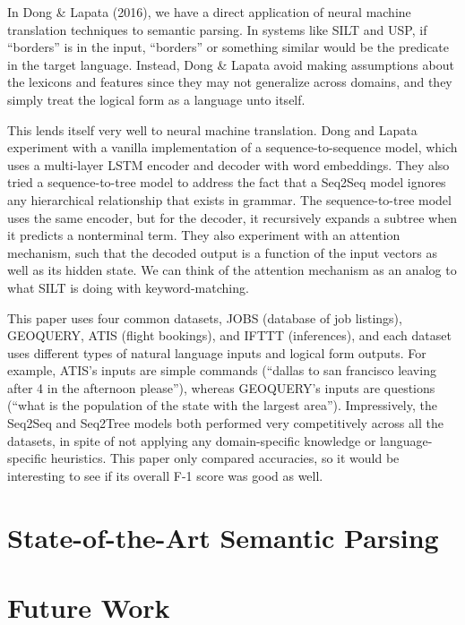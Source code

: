 \documentclass[a4paper]{article}
\theoremstyle{definition}
\begin{document}
In Dong \& Lapata (2016), we have a direct application of neural machine translation techniques to semantic parsing. In systems like SILT and USP, if ``borders'' is in the input, ``borders'' or something similar would be the predicate in the target language. Instead, Dong \& Lapata avoid making assumptions about the lexicons and features since they may not generalize across domains, and they simply treat the logical form as a language unto itself.

\quad This lends itself very well to neural machine translation. Dong and Lapata experiment with a vanilla implementation of a sequence-to-sequence model, which uses a multi-layer LSTM encoder and decoder with word embeddings. They also tried a sequence-to-tree model to address the fact that a Seq2Seq model ignores any hierarchical relationship that exists in grammar. The sequence-to-tree model uses the same encoder, but for the decoder, it recursively expands a subtree when it predicts a nonterminal term. They also experiment with an attention mechanism, such that the decoded output is a function of the input vectors as well as its hidden state. We can think of the attention mechanism as an analog to what SILT is doing with keyword-matching.

\quad This paper uses four common datasets, JOBS (database of job listings), GEOQUERY, ATIS (flight bookings), and IFTTT (inferences), and each dataset uses different types of natural language inputs and logical form outputs. For example, ATIS's inputs are simple commands (``dallas to san francisco leaving after 4 in the afternoon please''), whereas GEOQUERY's inputs are questions (``what is the population of the state with the largest area''). Impressively, the Seq2Seq and Seq2Tree models both performed very competitively across all the datasets, in spite of not applying any domain-specific knowledge or language-specific heuristics. This paper only compared accuracies, so it would be interesting to see if its overall F-1 score was good as well.

\section{State-of-the-Art Semantic Parsing}



\section{Future Work}
\end{document}
